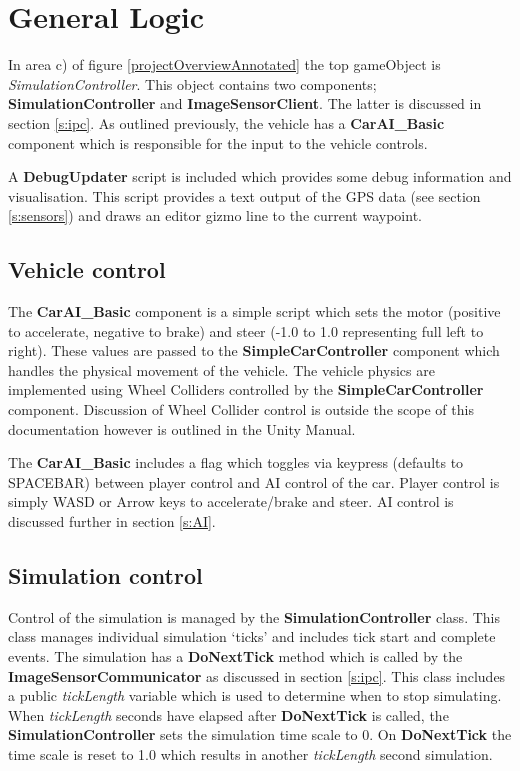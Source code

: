 \documentclass{article}
\begin{document}
\section{General Logic}

In area c) of figure \ref{projectOverviewAnnotated} the top gameObject is \textit{SimulationController}. This object contains two components; \textbf{SimulationController} and \textbf{ImageSensorClient}. The latter is discussed in section \ref{s:ipc}. As outlined previously, the vehicle has a \textbf{CarAI\_Basic} component which is responsible for the input to the vehicle controls.

A \textbf{DebugUpdater} script is included which provides some debug information and visualisation. This script provides a text output of the GPS data (see section \ref{s:sensors}) and draws an editor gizmo line to the current waypoint.

\subsection{Vehicle control}

The \textbf{CarAI\_Basic} component is a simple script which sets the motor (positive to accelerate, negative to brake) and steer (-1.0 to 1.0 representing full left to right). These values are passed to the \textbf{SimpleCarController} component which handles the physical movement of the vehicle. The vehicle physics are implemented using Wheel Colliders controlled by the \textbf{SimpleCarController} component. Discussion of Wheel Collider control is outside the scope of this documentation however is outlined in the Unity Manual.

The \textbf{CarAI\_Basic} includes a flag which toggles via keypress (defaults to SPACEBAR) between player control and AI control of the car. Player control is simply WASD or Arrow keys to accelerate/brake and steer. AI control is discussed further in section \ref{s:AI}.

\subsection{Simulation control}

Control of the simulation is managed by the \textbf{SimulationController} class. This class manages individual simulation `ticks' and includes tick start and complete events. The simulation has a \textbf{DoNextTick} method which is called by the \textbf{ImageSensorCommunicator} as discussed in section \ref{s:ipc}. This class includes a public \textit{tickLength} variable which is used to determine when to stop simulating. When \textit{tickLength} seconds have elapsed after \textbf{DoNextTick} is called, the \textbf{SimulationController} sets the simulation time scale to 0. On \textbf{DoNextTick} the time scale is reset to 1.0 which results in another \textit{tickLength} second simulation.
\end{document}
